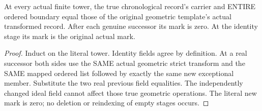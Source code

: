 \begin{lemma}
\label{hir:sharp-actual-finite-chronological-history-geometric-fields}
\leanok
At every actual finite tower, the true chronological record's carrier and
ENTIRE ordered boundary equal those of the original geometric template's
actual transformed record. After each genuine successor its mark is zero.
At the identity stage its mark is the original actual mark.
\end{lemma}
\begin{proof}
Induct on the literal tower. Identity fields agree by definition. At a real
successor both sides use the SAME actual geometric strict transform and the
SAME mapped ordered list followed by exactly the same new exceptional member.
Substitute the two real previous field equalities. The independently changed
ideal field cannot affect those true geometric operations. The literal new
mark is zero; no deletion or reindexing of empty stages occurs.
\end{proof}

